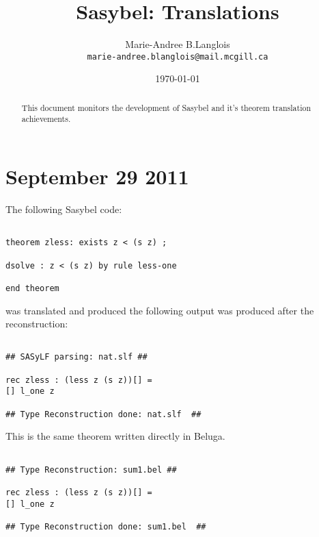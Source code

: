 \documentclass[12pt]{article}
\begin{document}
\title{\textmd{Sasybel}: Translations}
\author{
        Marie-Andree B.Langlois \\
        \texttt{marie-andree.blanglois@mail.mcgill.ca}
}
\date{\today}
\maketitle

\begin{abstract}
This document monitors the development of Sasybel and it's theorem translation achievements.
\end{abstract}

\section{September 29 2011}
The following \textmd{Sasybel} code:
\begin{verbatim}

theorem zless: exists z < (s z) ;

dsolve : z < (s z) by rule less-one

end theorem

\end{verbatim}
was translated and produced the following output was produced after the reconstruction:
\begin{verbatim}

## SASyLF parsing: nat.slf ##

rec zless : (less z (s z))[] = 
[] l_one z

## Type Reconstruction done: nat.slf  ##

\end{verbatim}
This is the same theorem written directly in \textmd{Beluga}.
\begin{verbatim}

## Type Reconstruction: sum1.bel ##

rec zless : (less z (s z))[] = 
[] l_one z

## Type Reconstruction done: sum1.bel  ##
\end{verbatim}
\end{document}
